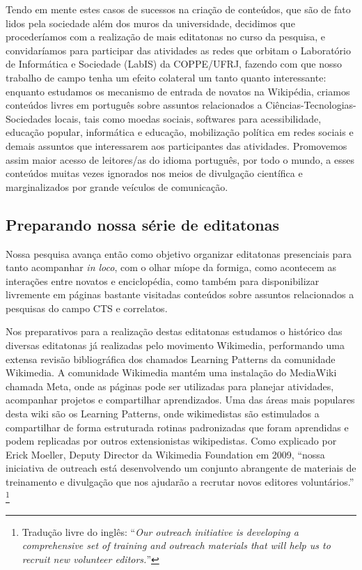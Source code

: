 Tendo em mente estes casos de sucessos na criação de conteúdos, que são de fato lidos pela sociedade além dos muros da universidade, decidimos que procederíamos com a realização de mais editatonas no curso da pesquisa, e convidaríamos para participar das atividades as redes que orbitam o Laboratório de Informática e Sociedade (LabIS) da COPPE/UFRJ, fazendo com que nosso trabalho de campo tenha um efeito colateral um tanto quanto interessante: enquanto estudamos os mecanismo de entrada de novatos na Wikipédia, criamos conteúdos livres em português sobre assuntos relacionados a Ciências-Tecnologias-Sociedades locais, tais como moedas sociais, softwares para acessibilidade, educação popular, informática e educação, mobilização política em redes sociais e demais assuntos que interessarem aos participantes das atividades. Promovemos assim maior acesso de leitores/as do idioma português, por todo o mundo, a esses conteúdos muitas vezes ignorados nos meios de divulgação científica e marginalizados por grande veículos de comunicação.

\subsection{Preparando nossa série de editatonas}

Nossa pesquisa avança então como objetivo organizar editatonas presenciais para tanto acompanhar \textit{in loco}, com o olhar míope da formiga, como acontecem as interações entre novatos e enciclopédia, como também para disponibilizar livremente em páginas bastante visitadas conteúdos sobre assuntos relacionados a pesquisas do campo CTS e correlatos.

Nos preparativos para a realização destas editatonas estudamos o histórico das diversas editatonas já realizadas pelo movimento Wikimedia, performando uma extensa revisão bibliográfica dos chamados Learning Patterns da comunidade Wikimedia. A comunidade Wikimedia mantém uma instalação do MediaWiki chamada Meta, onde as páginas pode ser utilizadas para planejar atividades, acompanhar projetos e compartilhar aprendizados.  Uma das áreas mais populares desta wiki são os Learning Patterns, onde wikimedistas são estimulados a compartilhar de forma estruturada rotinas padronizadas que foram aprendidas e podem replicadas por outros extensionistas wikipedistas. Como explicado por Erick Moeller, Deputy Director da Wikimedia Foundation em 2009, ``nossa iniciativa de outreach está desenvolvendo um conjunto abrangente de materiais de treinamento e divulgação que nos ajudarão a recrutar novos editores voluntários.'' \citep{moeller_wikipedias_2009}\footnote{Tradução livre do inglês: ``\textit{Our outreach initiative is developing a comprehensive set of training and outreach materials that will help us to recruit new volunteer editors.}''}

